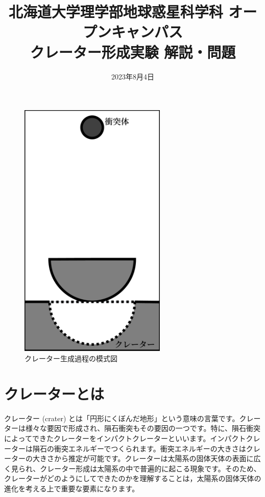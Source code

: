 \documentclass[a4paper]{ltjsarticle}
\begin{document}
\title{北海道大学理学部地球惑星科学科 オープンキャンパス\\クレーター形成実験 解説・問題}
\date{2023年8月4日}
\maketitle
\thispagestyle{empty}

\begin{figure}
    \vspace{-8mm}
    \includegraphics[width=70mm,clip]{./figure/explanation_figure.pdf}
    \vspace{-6mm}
    \caption{クレーター生成過程の模式図}
\end{figure}
\section{クレーターとは}
クレーター (crater) とは「円形にくぼんだ地形」という意味の言葉です。クレーターは様々な要因で形成され、隕石衝突もその要因の一つです。特に、隕石衝突によってできたクレーターをインパクトクレーターといいます。インパクトクレーターは隕石の衝突エネルギーでつくられます。衝突エネルギーの大きさはクレーターの大きさから推定が可能です。クレーターは太陽系の固体天体の表面に広く見られ、クレーター形成は太陽系の中で普遍的に起こる現象です。そのため、クレーターがどのようにしてできたのかを理解することは，太陽系の固体天体の進化を考える上で重要な要素になります。
\end{document}
